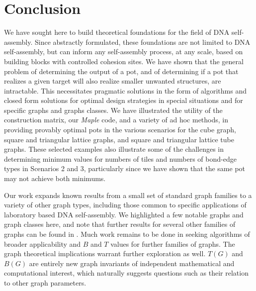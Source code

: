 \documentclass{elsarticle}
\theoremstyle{definition}
\theoremstyle{remark}
\theoremstyle{plain}
\theoremstyle{plain}
\begin{document}
\section{Conclusion}\label{conclusion}

We have sought here to build theoretical foundations for the field of DNA self-assembly.  Since abstractly formulated, these foundations are not limited to DNA self-assembly, but can inform any self-assembly process, at any scale, based on  building blocks with controlled cohesion sites.  We have shown that the general problem of determining the output of a pot, and of determining if a pot that realizes a given target will also realize smaller unwanted structures, are intractable.  This necessitates pragmatic solutions in the form of algorithms and closed form solutions for optimal design strategies in special situations and for specific graphs and graphs classes.    We have illustrated the utility of the construction matrix, our \emph{Maple} code, and a variety of ad hoc methods, in providing provably optimal pots in the various scenarios for the cube graph, square and triangular lattice graphs, and square and triangular lattice tube graphs. These selected examples also illustrate some of the challenges in determining minimum values for numbers of tiles and numbers of bond-edge types in Scenarios 2 and 3, particularly since we have shown that the same pot may not achieve both minimums.  
 
Our work expands known results from a small set of standard graph families to a variety of other graph types, including those common to specific applications of laboratory based DNA self-assembly. We highlighted a few notable graphs and graph classes here, and note that further results for several other families of graphs can be found in \cite{repository}.  
Much work remains to be done in seeking algorithms of broader applicability and $B$ and $T$ values for further families of graphs.  The graph theoretical implications warrant further exploration as well.  $T(G)$  and $B(G)$ are entirely  new  graph  invariants  of  independent  mathematical  and computational interest,  which naturally suggests questions such as their relation to other graph parameters.
\end{document}
